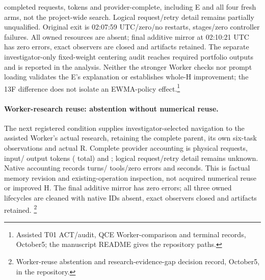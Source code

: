 \AssistedTOneTerminalRequests{} completed requests, \AssistedTOneTerminalTokens{}
tokens and \AssistedTOneTerminalCost{} provider-complete, including E and all
four fresh arms, not the project-wide search. Logical request/retry detail
remains partially unqualified. Original exit is 02:07:59 UTC/zero/no restarts,
\AssistedTOneTerminalStages{} stages/zero controller failures. All
\AssistedTOneOwnedResources{} owned resources are absent; final additive mirror
at 02:10:21 UTC has zero errors, exact observers are closed and artifacts retained.
The separate investigator-only fixed-weight centering audit reaches required
portfolio outputs and is reported in the analysis.
Neither the stronger Worker checks nor prompt loading validates the E's
explanation or establishes whole-H improvement; the 13F difference does not
isolate an EWMA-policy effect.\footnote{Assisted T01 ACT/audit, QCE
Worker-comparison and terminal records, October5; the manuscript README gives
the repository paths.}

\paragraph{Worker-research reuse: abstention without numerical reuse.}
The next registered condition supplies investigator-selected navigation to the
assisted Worker's actual research, retaining the complete parent, its own
six-task observations and actual R.
Complete provider accounting is \WorkerReuseRequests{} physical requests,
\WorkerReuseInputTokens{} input/\WorkerReuseOutputTokens{} output tokens
(\WorkerReuseTokens{} total) and \WorkerReuseCost{}; logical request/retry
detail remains unknown. Native accounting records \WorkerReuseNativeTurns{}
turns/\WorkerReuseNativeToolCalls{} tools/zero errors and
\WorkerReuseNativeSeconds{} seconds. This is factual memory revision and
existing-operation inspection, not acquired numerical reuse or improved H.
The final additive mirror has zero errors; all three owned lifecycles are
cleaned with native IDs absent, exact observers closed and artifacts retained.
\footnote{Worker-reuse abstention and research-evidence-gap decision record,
October5, in the repository.}
